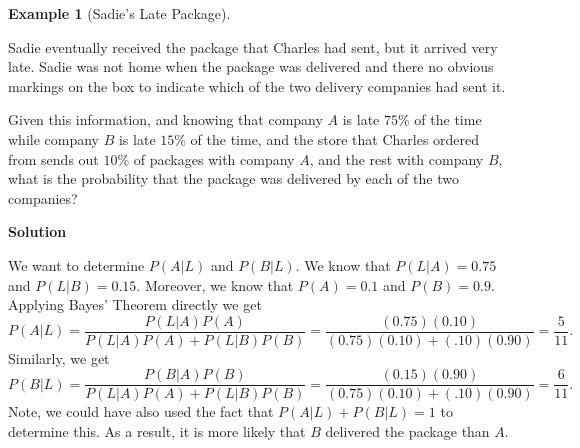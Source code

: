 \documentclass[
  letterpaper,
  DIV=11,
  numbers=noendperiod]{scrreprt}
\theoremstyle{definition}
\theoremstyle{definition}
\theoremstyle{definition}
\newtheorem{example}{Example}[chapter]
\theoremstyle{remark}
\begin{document}
\begin{example}[Sadie's Late
Package]\protect\hypertarget{exm-bayes-theorem}{}\label{exm-bayes-theorem}

Sadie eventually received the package that Charles had sent, but it
arrived very late. Sadie was not home when the package was delivered and
there no obvious markings on the box to indicate which of the two
delivery companies had sent it.

Given this information, and knowing that company \(A\) is late \(75\%\)
of the time while company \(B\) is late \(15\%\) of the time, and the
store that Charles ordered from sends out \(10\%\) of packages with
company \(A\), and the rest with company \(B\), what is the probability
that the package was delivered by each of the two companies?

\begin{tcolorbox}[enhanced jigsaw, colback=white, breakable, rightrule=.15mm, leftrule=.75mm, toprule=.15mm, left=2mm, arc=.35mm, opacityback=0, bottomrule=.15mm]

\vspace{-3mm}\textbf{Solution}\vspace{3mm}

We want to determine \(P(A|L)\) and \(P(B|L)\). We know that
\(P(L|A) = 0.75\) and \(P(L|B) = 0.15\). Moreover, we know that
\(P(A) = 0.1\) and \(P(B) = 0.9\). Applying Bayes' Theorem directly we
get
\[P(A|L) = \frac{P(L|A)P(A)}{P(L|A)P(A) + P(L|B)P(B)} = \frac{(0.75)(0.10)}{(0.75)(0.10) + (.10)(0.90)} = \frac{5}{11}.\]
Similarly, we get
\[P(B|L) = \frac{P(B|A)P(B)}{P(L|A)P(A) + P(L|B)P(B)} = \frac{(0.15)(0.90)}{(0.75)(0.10) + (.10)(0.90)} = \frac{6}{11}.\]
Note, we could have also used the fact that \(P(A|L) + P(B|L) = 1\) to
determine this. As a result, it is more likely that \(B\) delivered the
package than \(A\).\footnotemark{}

\end{tcolorbox}


\end{example}
\end{document}
